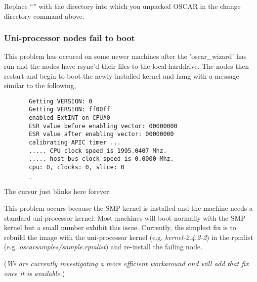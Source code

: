 Replace ``'' with the directory into which you unpacked
\endchange
OSCAR in the change directory command above.

\subsubsection{Uni-processor nodes fail to boot}
\begchange
This problem has occured on some newer machines after the 'oscar\_wizard' 
has run and the nodes have rsync'd their files to the local harddrive. 
The nodes then restart and begin to boot the newly installed kernel
and hang with a message similar to the following,
\begin{verbatim}
       Getting VERSION: 0
       Getting VERSION: ff00ff
       enabled ExtINT on CPU#0
       ESR value before enabling vector: 00000000
       ESR value after enabling vector: 00000000
       calibrating APIC timer ...
       ..... CPU clock speed is 1995.0407 Mhz.
       ..... host bus clock speed is 0.0000 Mhz.
       cpu: 0, clocks: 0, slice: 0
       _
\end{verbatim}
The cursur just blinks here forever.

This problem occurs because the SMP kernel is installed and the
machine needs a standard uni-processor kernel.  Most machines will boot
normally with the SMP kernel but a small number exhibit this issue.
Currently, the simplest fix is to rebuild the image with the
uni-processor kernel (e.g. \emph{kernel-2.4.2-2}) in the rpmlist 
(e.g. \emph{oscarsamples/sample.rpmlist}) and re-install the failing node.  

\noindent (\emph{We are currently investigating a more efficient workaround and 
will add that fix once it is available.})


